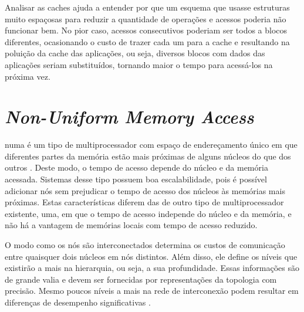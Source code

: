 Analisar as caches ajuda a entender por que um esquema que usasse estruturas muito espaçosas para reduzir a quantidade de operações e acessos poderia não funcionar bem.
No pior caso, acessos consecutivos poderiam ser todos a blocos diferentes, ocasionando o custo de trazer cada um para a cache e resultando na poluição da cache das aplicações, ou seja, diversos blocos com dados das aplicações seriam substituídos, tornando maior o tempo para acessá-los na próxima vez.


\section{\textit{Non-Uniform Memory Access}}
\label{sec:numa}

\ac{numa} é um tipo de multiprocessador com espaço de endereçamento único em que diferentes partes da memória estão mais próximas de alguns núcleos do que dos outros \cite{Patterson}.
Deste modo, o tempo de acesso depende do núcleo e da memória acessada.
Sistemas desse tipo possuem boa escalabilidade, pois é possível adicionar nós sem prejudicar o tempo de acesso dos núcleos às memórias mais próximas.
Estas características diferem das de outro tipo de multiprocessador existente, \ac{uma}, em que o tempo de acesso independe do núcleo e da memória, e não há a vantagem de memórias locais com tempo de acesso reduzido.

O modo como os nós são interconectados determina os custos de comunicação entre quaisquer dois núcleos em nós distintos.
Além disso, ele define os níveis que existirão a mais na hierarquia, ou seja, a sua profundidade.
Essas informações são de grande valia e devem ser fornecidas por representações da topologia com precisão.
Mesmo poucos níveis a mais na rede de interconexão podem resultar em diferenças de desempenho significativas \cite{MPITopFunc}.
